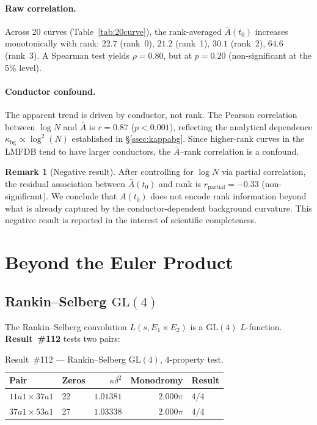 \documentclass[11pt, a4paper]{article}
\theoremstyle{plain}
\theoremstyle{definition}
\newtheorem{remark}{Remark}[section]
\begin{document}
\paragraph{Raw correlation.}
Across 20 curves (Table~\ref{tab:20curve}), the rank-averaged
$\bar{A}(t_{0})$ increases monotonically with rank: $22.7$ (rank~0),
$21.2$ (rank~1), $30.1$ (rank~2), $64.6$ (rank~3).  A Spearman test
yields $\rho=0.80$, but at $p=0.20$ (non-significant at the 5\% level).

\paragraph{Conductor confound.}
The apparent trend is driven by conductor, not rank.  The Pearson
correlation between $\log N$ and $\bar{A}$ is $r=0.87$ ($p<0.001$),
reflecting the analytical dependence
$\kappa_{\mathrm{bg}} \propto \log^{2}(N)$ established in
\S\ref{ssec:kappabg}.  Since higher-rank curves in the LMFDB tend to
have larger conductors, the $\bar{A}$--rank correlation is a confound.

\begin{remark}[Negative result]
\label{rem:arank}
After controlling for $\log N$ via partial correlation, the
residual association between $\bar{A}(t_{0})$ and rank is
$r_{\mathrm{partial}} = -0.33$ (non-significant).  We conclude that
$A(t_{0})$ does not encode rank information beyond what is already
captured by the conductor-dependent background curvature.
This negative result is reported in the interest of scientific
completeness.
\end{remark}


\section{Beyond the Euler Product}
\label{sec:beyond}

\subsection{Rankin--Selberg $\mathrm{GL}(4)$}
\label{sec:gl4rs}

The Rankin--Selberg convolution $L(s, E_{1}\times E_{2})$ is a
$\mathrm{GL}(4)$ $L$-function.  \textbf{Result~\#112} tests two pairs:

\begin{table}[ht]
\centering
\caption{Result~\#112 — Rankin--Selberg $\mathrm{GL}(4)$, 4-property test.}
\label{tab:rs112}
\small
\begin{tabular}{llrrl}
\toprule
Pair & Zeros & $\kappa\delta^{2}$ & Monodromy & Result \\
\midrule
$11a1 \times 37a1$ & 22 & $1.01381$ & $2.000\pi$ & $4/4$ \\
$37a1 \times 53a1$ & 27 & $1.03338$ & $2.000\pi$ & $4/4$ \\
\bottomrule
\end{tabular}
\end{table}
\end{document}
